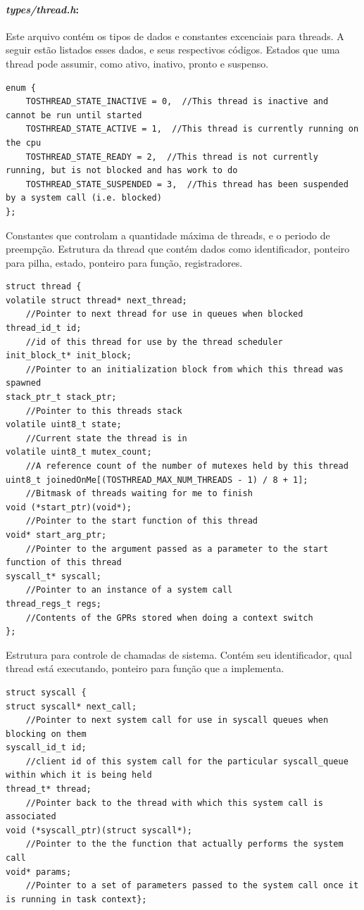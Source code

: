 \documentclass[a4paper, 10pt]{article}
\begin{document}
\paragraph{\textit{types/thread.h}:} 
Este arquivo contém os tipos de dados e constantes excenciais para threads. A seguir estão listados esses dados, e seus
respectivos códigos.
Estados que uma thread pode assumir, como ativo, inativo, pronto e suspenso.
\begin{lstlisting}
enum {
    TOSTHREAD_STATE_INACTIVE = 0,  //This thread is inactive and cannot be run until started
    TOSTHREAD_STATE_ACTIVE = 1,  //This thread is currently running on the cpu
    TOSTHREAD_STATE_READY = 2,  //This thread is not currently running, but is not blocked and has work to do 
    TOSTHREAD_STATE_SUSPENDED = 3,  //This thread has been suspended by a system call (i.e. blocked)
};
\end{lstlisting}
Constantes que controlam a quantidade máxima de threads, e o periodo de preempção.
\label{thread_t}Estrutura da thread que contém dados como identificador, ponteiro para pilha, estado, ponteiro para função,
registradores.
\begin{lstlisting}
struct thread {
volatile struct thread* next_thread;  
    //Pointer to next thread for use in queues when blocked
thread_id_t id;                       
    //id of this thread for use by the thread scheduler
init_block_t* init_block;             
    //Pointer to an initialization block from which this thread was spawned
stack_ptr_t stack_ptr;                
    //Pointer to this threads stack
volatile uint8_t state;               
    //Current state the thread is in
volatile uint8_t mutex_count;         
    //A reference count of the number of mutexes held by this thread
uint8_t joinedOnMe[(TOSTHREAD_MAX_NUM_THREADS - 1) / 8 + 1]; 
    //Bitmask of threads waiting for me to finish
void (*start_ptr)(void*);             
    //Pointer to the start function of this thread
void* start_arg_ptr;                  
    //Pointer to the argument passed as a parameter to the start function of this thread
syscall_t* syscall;                   
    //Pointer to an instance of a system call
thread_regs_t regs;                   
    //Contents of the GPRs stored when doing a context switch
};
\end{lstlisting}
Estrutura para controle de chamadas de sistema. Contém seu identificador, qual thread está executando, 
ponteiro para função que a implementa.
\begin{lstlisting}
struct syscall {
struct syscall* next_call;        
    //Pointer to next system call for use in syscall queues when blocking on them
syscall_id_t id;                  
    //client id of this system call for the particular syscall_queue within which it is being held
thread_t* thread;                 
    //Pointer back to the thread with which this system call is associated
void (*syscall_ptr)(struct syscall*);   
    //Pointer to the the function that actually performs the system call
void* params;                     
    //Pointer to a set of parameters passed to the system call once it is running in task context};
\end{lstlisting}
\end{document}
